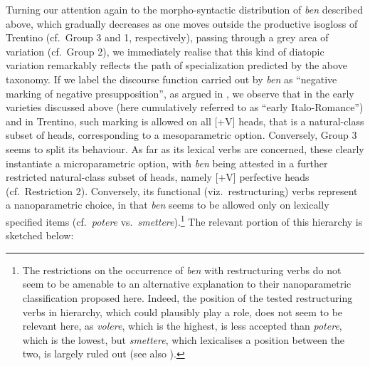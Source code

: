 \documentclass[output=paper]{langsci/langscibook}
\begin{document}
Turning our attention again to the morpho-syntactic distribution of \emph{ben}
described above, which gradually decreases as one moves outside the productive
isogloss of Trentino (cf.\ Group 3 and 1, respectively), passing through a grey
area of variation (cf.\ Group 2), we immediately realise that this kind of
diatopic variation remarkably reflects the path of specialization predicted by
the above taxonomy. If we label the discourse function carried out by
\emph{ben} as \enquote{negative marking of negative presupposition}, as argued in
\textcite{CognSchi2018b}, we observe that in the early varieties discussed
above (here cumulatively referred to as \enquote{early Italo-Romance}) and in Trentino,
such marking is allowed on all [+V] heads, that is a natural-class subset of
heads, corresponding to a mesoparametric option. Conversely, Group 3 seems to
split its behaviour. As far as its lexical verbs are concerned, these clearly
instantiate a microparametric option, with \emph{ben} being attested in a
further restricted natural-class subset of heads, namely [+V] perfective heads
(cf.\ Restriction 2). Conversely, its functional (viz.\ restructuring) verbs
represent a nanoparametric choice, in that \emph{ben} seems to be allowed only
on lexically specified items (cf.\ \emph{potere} vs.\
\emph{smettere}).\footnote{The restrictions on the occurrence of \emph{ben} with
    restructuring verbs do not seem to be amenable to an alternative
    explanation to their nanoparametric classification proposed here. Indeed,
    the position of the tested restructuring verbs in \citegen{Cinque2006}
    hierarchy, which could plausibly play a role, does not seem to be relevant
    here, as \emph{volere}, which is the highest, is less accepted than
    \emph{potere}, which is the lowest, but \emph{smettere}, which lexicalises
    a position between the two, is largely ruled out (see also
\citealt{CognSchi2018}).} The relevant portion of this hierarchy is sketched
below:
\end{document}
